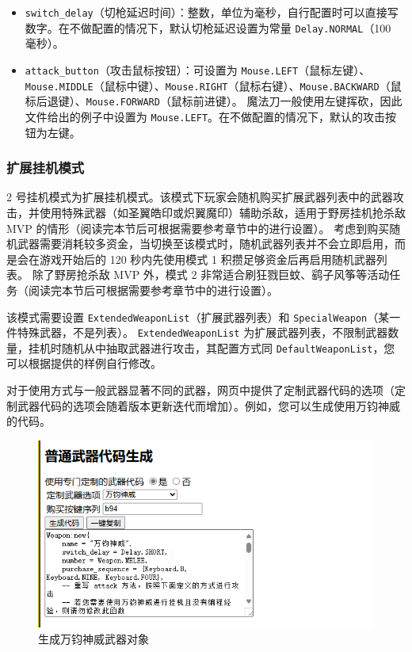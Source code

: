 \begin{itemize}
\item \lstinline{switch_delay}（切枪延迟时间）：整数，单位为毫秒，自行配置时可以直接写数字。在不做配置的情况下，默认切枪延迟设置为常量 \lstinline{Delay.NORMAL}（100 毫秒）。
\item \lstinline{attack_button}（攻击鼠标按钮）：可设置为 \lstinline{Mouse.LEFT}（鼠标左键）、\lstinline{Mouse.MIDDLE}（鼠标中键）、\lstinline{Mouse.RIGHT}（鼠标右键）、\lstinline{Mouse.BACKWARD}（鼠标后退键）、\lstinline{Mouse.FORWARD}（鼠标前进键）。
魔法刀一般使用左键挥砍，因此文件给出的例子中设置为 \lstinline{Mouse.LEFT}。在不做配置的情况下，默认的攻击按钮为左键。
\end{itemize}

\subsubsection{扩展挂机模式}

2 号挂机模式为扩展挂机模式。该模式下玩家会随机购买扩展武器列表中的武器攻击，并使用特殊武器（如圣翼皓印或炽翼魔印）辅助杀敌，适用于野房挂机抢杀敌 MVP 的情形（阅读完本节后可根据需要参考章节中的进行设置）。
考虑到购买随机武器需要消耗较多资金，当切换至该模式时，随机武器列表并不会立即启用，而是会在游戏开始后的 120 秒内先使用模式 1 积攒足够资金后再启用随机武器列表。
除了野房抢杀敌 MVP 外，模式 2 非常适合刷狂戮巨蚊、鹞子风筝等活动任务（阅读完本节后可根据需要参考章节中的进行设置）。

该模式需要设置 \lstinline{ExtendedWeaponList}（扩展武器列表）和 \lstinline{SpecialWeapon}（某一件特殊武器，不是列表）。
\lstinline{ExtendedWeaponList} 为扩展武器列表，不限制武器数量，挂机时随机从中抽取武器进行攻击，其配置方式同 \lstinline{DefaultWeaponList}，您可以根据提供的样例自行修改。

对于使用方式与一般武器显著不同的武器，网页中提供了定制武器代码的选项（定制武器代码的选项会随着版本更新迭代而增加）。例如，您可以生成使用万钧神威的代码。

\begin{figure}
    \Centering
    \includegraphics[width=\textwidth]{docs/assets/generate_brionac_code}
    \caption{生成万钧神威武器对象}
\end{figure}

